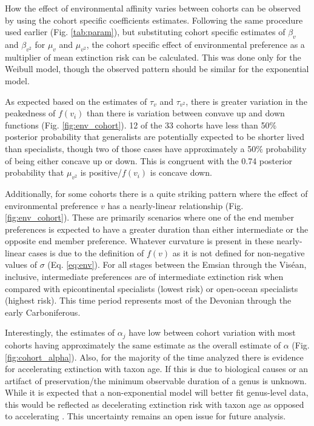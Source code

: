 \documentclass{article}
\begin{document}
How the effect of environmental affinity varies between cohorts can be observed by using the cohort specific coefficients estimates. Following the same procedure used earlier (Fig. \ref{tab:param}), but substituting cohort specific estimates of \(\beta_{v}\) and \(\beta_{v^{2}}\) for \(\mu_{v}\) and \(\mu_{v^{2}}\), the cohort specific effect of environmental preference as a multiplier of mean extinction risk can be calculated. This was done only for the Weibull model, though the observed pattern should be similar for the exponential model. 

As expected based on the estimates of \(\tau_{v}\) and \(\tau_{v^{2}}\), there is greater variation in the peakedness of \(f(v_{i})\) than there is variation between convave up and down functions (Fig. \ref{fig:env_cohort}). 12 of the 33 cohorts have less than 50\% posterior probability that generalists are potentially expected to be shorter lived than specialists, though two of those cases have approximately a 50\% probability of being either concave up or down. This is congruent with the 0.74 posterior probability that \(\mu_{v^{2}}\) is positive/\(f(v_{i})\) is concave down.

Additionally, for some cohorts there is a quite striking pattern where the effect of environmental preference \(v\) has a nearly-linear relationship (Fig. \ref{fig:env_cohort}). These are primarily scenarios where one of the end member preferences is expected to have a greater duration than either intermediate or the opposite end member preference. Whatever curvature is present in these nearly-linear cases is due to the definition of \(f(v)\) as it is not defined for non-negative values of \(\sigma\) (Eq. \ref{eq:env}). For all stages between the Emsian through the Vis\'{e}an, inclusive, intermediate preferences are of intermediate extinction risk when compared with epicontinental specialists (lowest risk) or open-ocean specialists (highest risk). This time period represents most of the Devonian through the early Carboniferous.

Interestingly, the estimates of \(\alpha_{j}\) have low between cohort variation with most cohorts having approximately the same estimate as the overall estimate of \(\alpha\) (Fig. \ref{fig:cohort_alpha}). Also, for the majority of the time analyzed there is evidence for accelerating extinction with taxon age. If this is due to biological causes \citep{Wagner2014b,Rosindell2015a} or an artifact of preservation/the minimum observable duration of a genus \citep{Sepkoski1975} is unknown. While it is expected that a non-exponential model will better fit genus-level data, this would be reflected as decelerating extinction risk with taxon age as opposed to accelerating \citep{Raup1975,Raup1978,Raup1985,Foote2001a}. This uncertainty remains an open issue for future analysis.
\end{document}
